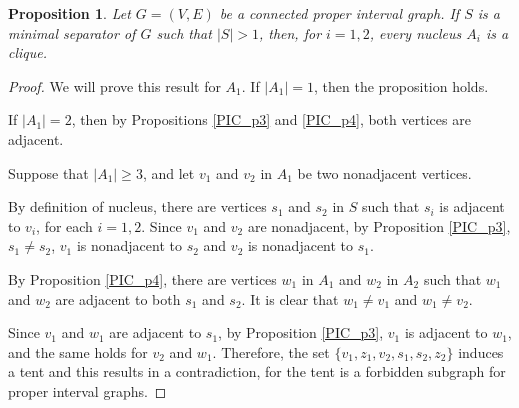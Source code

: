 \documentclass[12pt]{book}
\theoremstyle{plain}
\newtheorem{prop}[teo]{Proposition}
\theoremstyle{remark}
\begin{document}
\begin{prop} \label{PIC_p5}
	Let $G = (V, E)$ be a connected proper interval graph. 
	If $S$ is a minimal separator of $G$ such that $|S|>1$, then, for $i= 1,2$, every nucleus $A_i$ is a clique.
\end{prop}

\begin{proof}
	We will prove this result for $A_1$. If $|A_1| = 1$, then the proposition holds. 
	
	If $|A_1| = 2$, then by Propositions \ref{PIC_p3} and \ref{PIC_p4}, both vertices are adjacent.
	
	Suppose that $|A_1| \geq 3$, and let $v_1$ and $v_2$ in $A_1$ be two nonadjacent vertices. 
	
	By definition of nucleus, there are vertices $s_1$ and $s_2$ in $S$ such that $s_i$ is adjacent to $v_i$, for each $i=1,2$. 
	Since $v_1$ and $v_2$ are nonadjacent, by Proposition \ref{PIC_p3}, $s_1 \neq s_2$, $v_1$ is nonadjacent to $s_2$ and $v_2$ is nonadjacent to $s_1$.
	
	By Proposition \ref{PIC_p4}, there are vertices $w_1$ in $A_1$ and $w_2$ in $A_2$ such that $w_1$ and $w_2$ are adjacent to both $s_1$ and $s_2$. It is clear that $w_1 \neq v_1$ and $w_1 \neq v_2$.
	
	Since $v_1$ and $w_1$ are adjacent to $s_1$, by Proposition \ref{PIC_p3}, $v_1$ is adjacent to $w_1$, and the same holds for $v_2$ and $w_1$. 
	Therefore, the set $\{ v_1, z_1, v_2, s_1, s_2, z_2 \}$ induces a tent and this results in a contradiction, for the tent is a forbidden subgraph for proper interval graphs.
\end{proof}

\end{document}
